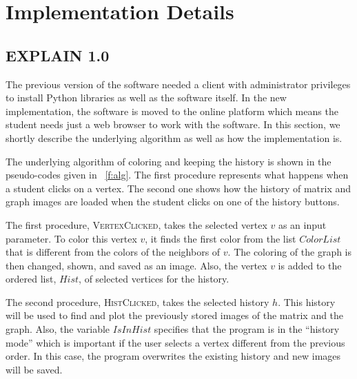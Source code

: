 \documentclass[11pt, twoside,a4paper]{book}
\begin{document}
\section{Implementation Details}
\label{s.impl.explain}
\subsection{EXPLAIN 1.0}
\label{s.impl.explain1}
The previous version of the software \cite{Lulfesmann2010} needed a client with administrator privileges to install Python libraries as well as the software itself. In the new implementation, the software is moved to the online platform which means the student needs just a web browser to work with the software. In this section, we shortly describe the underlying algorithm as well as how the implementation is.

The underlying algorithm of coloring and keeping the history is shown in the pseudo-codes given in \figurename~\ref{f:alg}. The first procedure represents what happens when a student clicks on a vertex. The second one shows how the history of matrix and graph images are loaded when the student clicks on one of the history buttons.

The first procedure, \textsc{VertexClicked}, takes the selected vertex $v$ as an input parameter. To color this vertex $v$, it finds the first color from the list $ColorList$ that is different from the colors of the neighbors of $v$. The coloring of the graph is then changed, shown, and saved as an image. Also, the vertex $v$ is added to the ordered list, $Hist$, of selected vertices for the history.

The second procedure, \textsc{HistClicked}, takes the selected history $h$. This history will be used to find and plot the previously stored images of the matrix and the graph. Also, the variable $IsInHist$ specifies that the program is in the ``history mode'' which is important if the user selects a vertex different from the previous order. In this case, the program overwrites the existing history and new images will be saved.
\end{document}
